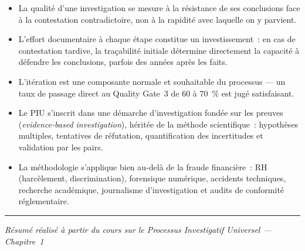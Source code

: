 \documentclass[11pt, a4paper]{article}
\begin{document}
\begin{itemize}[label=\textcolor{bleuMoyen}{---}]
  \item La qualit\'{e} d'une investigation se mesure \`{a} la r\'{e}sistance de ses
    conclusions face \`{a} la contestation contradictoire, non \`{a} la rapidit\'{e}
    avec laquelle on y parvient.

  \item L'effort documentaire \`{a} chaque \'{e}tape constitue un investissement~: en
    cas de contestation tardive, la tra\c{c}abilit\'{e} initiale d\'{e}termine
    directement la capacit\'{e} \`{a} d\'{e}fendre les conclusions, parfois des
    ann\'{e}es apr\`{e}s les faits.

  \item L'it\'{e}ration est une composante normale et souhaitable du processus --- un
    taux de passage direct au Quality Gate~3 de 60 \`{a} 70~\% est jug\'{e}
    satisfaisant.

  \item Le PIU s'inscrit dans une d\'{e}marche d'investigation fond\'{e}e sur les
    preuves (\textit{evidence-based investigation}), h\'{e}rit\'{e}e de la m\'{e}thode
    scientifique~: hypoth\`{e}ses multiples, tentatives de r\'{e}futation,
    quantification des incertitudes et validation par les pairs.

  \item La m\'{e}thodologie s'applique bien au-del\`{a} de la fraude financi\`{e}re~:
    RH (harc\`{e}lement, discrimination), forensique num\'{e}rique, accidents
    techniques, recherche acad\'{e}mique, journalisme d'investigation et audits de
    conformit\'{e} r\'{e}glementaire.
\end{itemize}

\vspace{14pt}
{\color{bleuMoyen}\rule{\linewidth}{0.6pt}}
\vspace{4pt}
\begin{center}
  \small\itshape\color{grisNote}
  R\'{e}sum\'{e} r\'{e}alis\'{e} \`{a} partir du cours sur le Processus Investigatif
  Universel --- Chapitre~1
\end{center}
\end{document}
